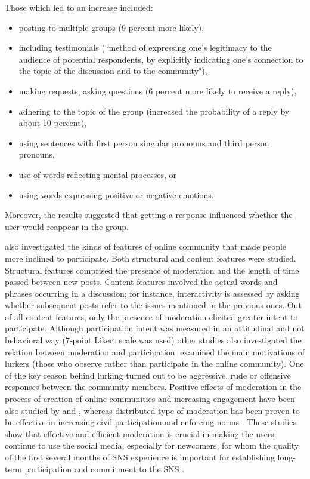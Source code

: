 \documentclass[a4paper,fleqn]{cas-dc}
\begin{document}
Those which led to an increase included: 
\begin{itemize}
    \item posting to multiple groups (9 percent more likely), 
    \item including testimonials (``method of expressing one's legitimacy to the audience of potential respondents, by explicitly indicating one's connection to the topic of the discussion and to the community"), 
    \item making requests, asking questions (6 percent more likely to receive a reply),
    \item adhering to the topic of the group (increased the probability of a reply by about 10 percent),
    \item using sentences with first person singular pronouns and third person pronouns,
    \item use of words reflecting mental processes, or
    \item using words expressing positive or negative emotions.
\end{itemize}
Moreover, the results suggested that 
getting a response influenced whether the user would reappear in the group. 


\citet{wise2006moderation} also investigated the kinds of features of online community that made people more inclined to participate. Both structural and content features were studied.  Structural features comprised the presence of moderation and the length of time passed between new posts. Content features involved the actual words and phrases occurring in a discussion; for instance, interactivity is assessed by asking whether subsequent posts refer to the issues mentioned in the previous ones.  
Out of all content features, only the presence of moderation elicited greater intent to participate.
Although participation intent was measured in an attitudinal and not behavioral way (7-point Likert scale was used) other studies also investigated the relation between moderation and participation. \citet{preece2004top} examined the main motivations of lurkers (those who observe rather than participate in the online community). One of the key reason behind lurking turned out to be aggressive, rude or offensive responses between the community members. Positive effects of moderation in the process of creation of online communities and increasing engagement have 
been also studied by \citet{meyer2014moderation} and \citet{carey2016influences}, whereas distributed type of moderation has been proven to be effective in increasing civil participation and enforcing norms \citep{lampe2014crowdsourcing}. These studies show that effective and efficient moderation is crucial in making the users continue to use the social media, especially for newcomers, for whom the quality of the first several months of SNS experience is important for  establishing long-term participation and commitment to the SNS \citep{raub2015phenomenological}.
\end{document}
